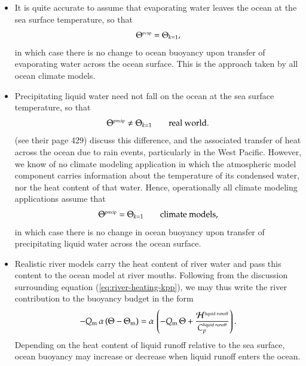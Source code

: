   \begin{itemize}

  \item It is quite accurate to assume that evaporating water leaves
    the ocean at the sea surface temperature, so that
\begin{equation}
   \Theta^{\mbox{\tiny evap}} = \Theta_{k=1},
\end{equation}
in which case there is no change to ocean buoyancy upon transfer of
evaporating water across the ocean surface.  This is the approach
taken by all ocean climate models.

\item Precipitating liquid water need not fall on the ocean at the sea
  surface temperature, so that
\begin{equation}
   \Theta^{\mbox{\tiny precip}} \ne \Theta_{k=1} \qquad \mbox{real world}.
\end{equation}
\cite{KanthaClaysonII} (see their page 429) discuss this difference,
and the associated transfer of heat across the ocean due to rain
events, particularly in the West Pacific.  However, we know of no
climate modeling application in which the atmospheric model component
carries information about the temperature of its condensed water, nor
the heat content of that water.  Hence, operationally all climate
modeling applications assume that
\begin{equation}
   \Theta^{\mbox{\tiny precip}} = \Theta_{k=1} \qquad \mbox{climate models},
\end{equation}
in which case there is no change in ocean buoyancy upon transfer of
precipitating liquid water across the ocean surface.  

\item Realistic river models carry the heat content of river water and
  pass this content to the ocean model at river mouths.  Following
  from the discussion surrounding equation
  (\ref{eq:river-heating-kpp}), we may thus write the river
  contribution to the buoyancy budget in the form
\begin{equation}
 -Q_{\mbox{\scriptsize m}} \, \alpha \, (\Theta - \Theta_{\mbox{\scriptsize m}}) = \alpha \, \left(
  -Q_{\mbox{\scriptsize m}} \, \Theta  + \frac{  {\cal H}^{\mbox{\tiny liquid runoff}} }  {C_{p}^{\mbox{\tiny liquid runoff}}} \right).
\end{equation}
Depending on the heat content of liquid runoff relative to the sea
surface, ocean buoyancy may increase or decrease when liquid runoff
enters the ocean.

\end{itemize}

